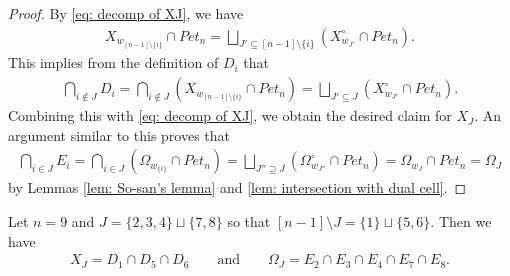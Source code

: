 \begin{proof}
By \eqref{eq: decomp of XJ}, we have
\begin{align*}
 X_{w_{[n-1]\setminus\{i\}}}\cap Pet_{n} = \bigsqcup_{J'\subseteq [n-1]\setminus\{i\}} (X^{\circ}_{w_{J'}}\cap Pet_{n}).
\end{align*}
This implies from the definition of $D_i$ that
\begin{align*}
 \bigcap_{i\notin J} D_i
 = \bigcap_{i\notin J} (X_{w_{[n-1]\setminus\{i\}}}\cap Pet_{n}) 
 = \bigsqcup_{J'\subseteq J} (X^{\circ}_{w_{J'}}\cap Pet_{n}).
\end{align*}
Combining this with \eqref{eq: decomp of XJ}, we obtain the desired claim for $X_J$. An argument similar to this proves that 
\begin{align*}
 \bigcap_{i\in J} E_i
 = \bigcap_{i\in J} (\Omega_{w_{\{i\}}}\cap Pet_{n}) 
 = \bigsqcup_{J''\supseteq J} (\Omega^{\circ}_{w_{J''}}\cap Pet_{n})
 = \Omega_{w_J}\cap Pet_{n}
 = \Omega_J
\end{align*}
by Lemmas \ref{lem: So-san's lemma} and \ref{lem: intersection with dual cell}.
\end{proof}

\begin{exam}\label{eg: intersection}
{\rm 
Let $n=9$ and $J=\{2,3,4\}\sqcup\{7,8\}$ so that $[n-1]\setminus J=\{1\}\sqcup\{5,6\}$. Then we have 
\begin{align*}
X_{J} = D_1\cap D_5\cap D_6
\qquad \text{and} \qquad
\Omega_{J} = E_2\cap E_3\cap E_4\cap E_7\cap E_8.
\end{align*}
}
\end{exam}


